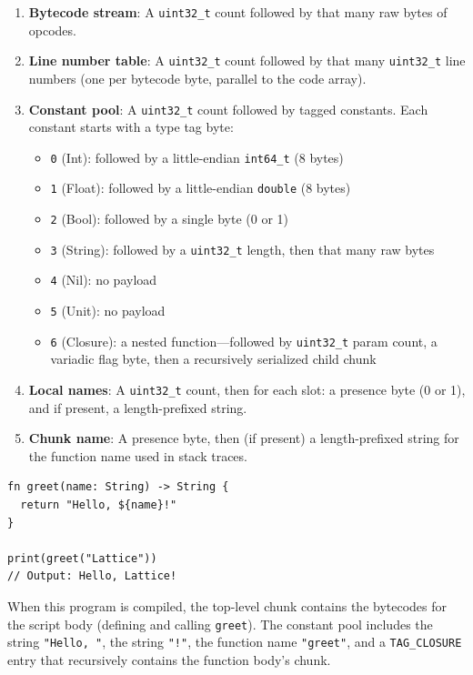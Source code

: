 \begin{enumerate}
  \item \textbf{Bytecode stream}: A \lstinline|uint32_t| count followed by that many raw bytes of opcodes.
  \item \textbf{Line number table}: A \lstinline|uint32_t| count followed by that many \lstinline|uint32_t| line numbers (one per bytecode byte, parallel to the code array).
  \item \textbf{Constant pool}: A \lstinline|uint32_t| count followed by tagged constants. Each constant starts with a type tag byte:
    \begin{itemize}
      \item \texttt{0} (Int): followed by a little-endian \lstinline|int64_t| (8 bytes)
      \item \texttt{1} (Float): followed by a little-endian \lstinline|double| (8 bytes)
      \item \texttt{2} (Bool): followed by a single byte (0 or 1)
      \item \texttt{3} (String): followed by a \lstinline|uint32_t| length, then that many raw bytes
      \item \texttt{4} (Nil): no payload
      \item \texttt{5} (Unit): no payload
      \item \texttt{6} (Closure): a nested function---followed by \lstinline|uint32_t| param count, a variadic flag byte, then a recursively serialized child chunk
    \end{itemize}
  \item \textbf{Local names}: A \lstinline|uint32_t| count, then for each slot: a presence byte (0 or 1), and if present, a length-prefixed string.
  \item \textbf{Chunk name}: A presence byte, then (if present) a length-prefixed string for the function name used in stack traces.
\end{enumerate}

\begin{lstlisting}[language=Lattice, caption={A program whose bytecode we will examine}]
fn greet(name: String) -> String {
  return "Hello, ${name}!"
}

print(greet("Lattice"))
// Output: Hello, Lattice!
\end{lstlisting}

When this program is compiled, the top-level chunk contains the bytecodes for the script body (defining and calling \lstinline|greet|). The constant pool includes the string \lstinline|"Hello, "|, the string \lstinline|"!"|, the function name \lstinline|"greet"|, and a \lstinline|TAG_CLOSURE| entry that recursively contains the function body's chunk.

